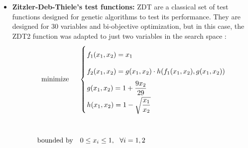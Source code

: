 \begin{itemize}
\item \textbf{Zitzler-Deb-Thiele's test functions:} ZDT are a classical set of test functions designed for genetic algorithms to test its performance. They are designed for 30 variables and bi-objective optimization, but in this case, the ZDT2 function was adapted to just two variables in the search space \cite{zitzler2000comparison}:
    \begin{equation}
\begin{array}{cl}
            \textrm{minimize} & 
            \left\{
             \arraycolsep=1.0pt\def\arraystretch{2.0} \begin{array}{l}
            f_1(x_1,x_2) = x_1\\
            f_2(x_1,x_2) = g(x_1,x_2) \cdot h(f_1(x_1,x_2),g(x_1,x_2))\\
            g(x_1,x_2) = 1+\dfrac{9x_2}{29} \\
            h(x_1,x_2) = 1 - \sqrt{\dfrac{x_1}{x_2}}
            \end{array} \right. \\
            & \\
           \textrm{bounded by} & 0 \leq x_i \leq 1, \ \ \forall i = 1,2
        \end{array}
        \label{eq:ZDT2}
    \end{equation}
\end{itemize}

\newpage

